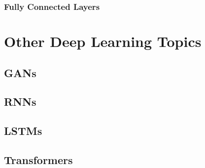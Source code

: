 \documentclass[10pt]{report}
\begin{document}
\subsection{Fully Connected Layers}

\chapter{Other Deep Learning Topics}
\section{GANs}
\section{RNNs}
\section{LSTMs}
\section{Transformers}
\end{document}
